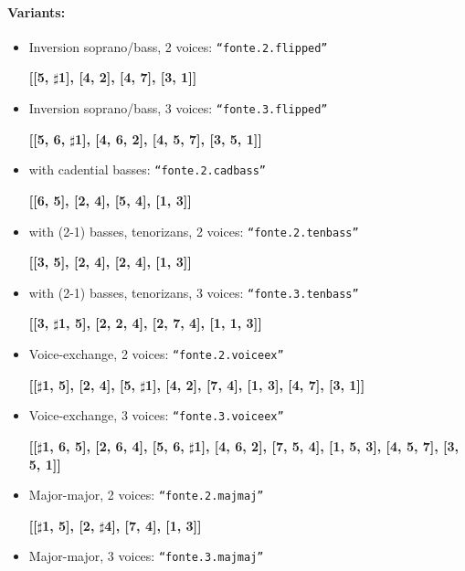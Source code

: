 \documentclass[11pt, openany]{article}
\begin{document}
\paragraph{Variants:}
\begin{itemize}
\item Inversion soprano/bass, 2 voices: \texttt{“fonte.2.flipped”}
	\begin{center}
	\textbf{[[5, $\sharp$1], [4, 2], [4, 7], [3, 1]]}
	\end{center}
\item Inversion soprano/bass, 3 voices: \texttt{“fonte.3.flipped”}
	\begin{center}
	\textbf{[[5, 6, $\sharp$1], [4, 6, 2], [4, 5, 7], [3, 5, 1]]}
	\end{center}
\item with cadential basses: \texttt{“fonte.2.cadbass”}
	\begin{center}
	\textbf{[[6, 5], [2, 4], [5, 4], [1, 3]]}
	\end{center}
\item with (2-1) basses, tenorizans, 2 voices: \texttt{“fonte.2.tenbass”}
	\begin{center}
	\textbf{[[3, 5], [2, 4], [2, 4], [1, 3]]}
	\end{center}
\item with (2-1) basses, tenorizans, 3 voices: \texttt{“fonte.3.tenbass”}
	\begin{center}
	\textbf{[[3, $\sharp$1, 5], [2, 2, 4], [2, 7, 4], [1, 1, 3]]}
	\end{center}
\item Voice-exchange, 2 voices: \texttt{“fonte.2.voiceex”}
	\begin{center}
	\textbf{[[$\sharp$1, 5], [2, 4], [5, $\sharp$1], [4, 2], [7, 4], [1, 3], [4, 7], [3, 1]]}
	\end{center}
\item Voice-exchange, 3 voices: \texttt{“fonte.3.voiceex”}
	\begin{center}
	\textbf{[[$\sharp$1, 6, 5], [2, 6, 4], [5, 6, $\sharp$1], [4, 6, 2], [7, 5, 4], [1, 5, 3], [4, 5, 7], [3, 5, 1]]}
	\end{center}
\item Major-major, 2 voices: \texttt{“fonte.2.majmaj”}
	\begin{center}
	\textbf{[[$\sharp$1, 5], [2, $\sharp$4], [7, 4], [1, 3]]}
	\end{center}
\item Major-major, 3 voices: \texttt{“fonte.3.majmaj”}
	\begin{center}

\end{center}
\end{itemize}
\end{document}
